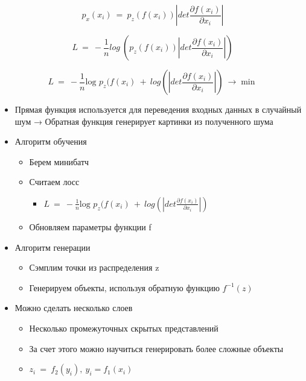 \documentclass[a4paper, 12pt]{article}
\begin{document}
\[p_{x}(x_{i})\  = \ p_{z}(f(x_{i}))|det\frac{\partial f(x_{i})}{\partial x_{i}}|\]

\[L\  = \  - \frac{1}{n}log\ (p_{z}(f(x_{i}))|det\frac{\partial f(x_{i})}{\partial x_{i}}|)\]

\[L\  = \  - \frac{1}{n}\text{log\ }p_{z}(f(x_{i})\  + \ log(|det\frac{\partial f(x_{i})}{\partial x_{i}}|)\  \rightarrow \min\]

\begin{itemize}
\item
  
  Прямая функция используется для переведения входных данных в случайный
  шум → Обратная функция генерирует картинки из полученного шума
  
\item
  
  {{Алгоритм обучения}}
  

  \begin{itemize}
  \item
    
    Берем минибатч
    
  \item
    
    Считаем лосс
    

    \begin{itemize}
    \item
      
      \(L\  = \  - \frac{1}{n}\text{log\ }p_{z}(f(x_{i})\  + \ log(|det\frac{\partial f(x_{i})}{\partial x_{i}}|)\)
      
    \end{itemize}
  \item Обновляем параметры функции f
  \end{itemize}
\item Алгоритм генерации
  \begin{itemize}
  \item Сэмплим точки из распределения z
  \item Генерируем объекты, используя обратную функцию \(f^{- 1}(z)\)
  \end{itemize}
\item
  
  Можно сделать {{несколько слоев}}
  

  \begin{itemize}
  \item
    
    Несколько промежуточных скрытых представлений
    
  \item
    
    За счет этого можно научиться генерировать более сложные объекты
    
  \item
    
    \(z_{i}\  = \ f_{2}(y_{i}),\ y_{i} = f_{1}(x_{i})\)
    
  \end{itemize}
\end{itemize}
\end{document}
